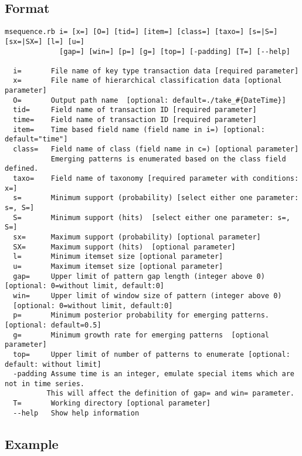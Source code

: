 \subsection{Format}
\begin{verbatim}
msequence.rb i= [x=] [O=] [tid=] [item=] [class=] [taxo=] [s=|S=] [sx=|SX=] [l=] [u=]
             [gap=] [win=] [p=] [g=] [top=] [-padding] [T=] [--help]

  i=       File name of key type transaction data [required parameter]
  x=       File name of hierarchical classification data [optional parameter] 
  O=       Output path name  [optional: default=./take_#{DateTime}]
  tid=     Field name of transaction ID [required parameter]
  time=    Field name of transaction ID [required parameter]
  item=    Time based field name (field name in i=) [optional: default="time"] 
  class=   Field name of class (field name in c=) [optional parameter] 
           Emerging patterns is enumerated based on the class field defined. 
  taxo=    Field name of taxonomy [required parameter with conditions: x=]
  s=       Minimum support (probability) [select either one parameter: s=, S=]
  S=       Minimum support (hits)  [select either one parameter: s=, S=]
  sx=      Maximum support (probability) [optional parameter] 
  SX=      Maximum support (hits)  [optional parameter] 
  l=       Minimum itemset size [optional parameter] 
  u=       Maximum itemset size [optional parameter] 
  gap=     Upper limit of pattern gap length (integer above 0) [optional: 0=without limit, default:0]
  win=     Upper limit of window size of pattern (integer above 0)  
  [optional: 0=without limit, default:0]
  p=       Minimum posterior probability for emerging patterns.  [optional: default=0.5] 
  g=       Minimum growth rate for emerging patterns  [optional parameter] 
  top=     Upper limit of number of patterns to enumerate [optional: default: without limit] 
  -padding Assume time is an integer, emulate special items which are not in time series. 
          This will affect the definition of gap= and win= parameter. 
  T=       Working directory [optional parameter] 
  --help   Show help information 
\end{verbatim}

\subsection{Example}




